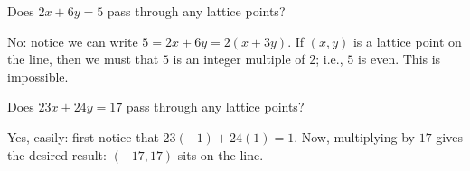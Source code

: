 \documentclass{article}
\begin{document}
\begin{example}
Does $2x+6y = 5$ pass through any lattice points?
\end{example}
\begin{solution}
No: notice we can write $5 = 2x+6y = 2(x+3y)$. If $(x,y)$ is a lattice point on the line, then we must that $5$ is an integer multiple of $2$; i.e., $5$ is even. This is impossible.
\end{solution}

\begin{example}
Does $23x + 24y = 17$ pass through any lattice points?
\end{example}
\begin{solution}
Yes, easily: first notice that $23(-1) + 24(1) = 1$. Now, multiplying by $17$ gives the desired result: $(-17, 17)$ sits on the line.
\end{solution}
\end{document}
